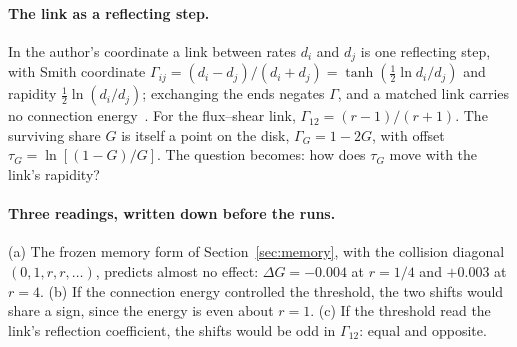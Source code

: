 \documentclass[11pt]{article}
\begin{document}
\paragraph{The link as a reflecting step.} In the author's coordinate a link between rates $d_i$ and $d_j$ is one reflecting step, with Smith coordinate $\Gamma_{ij}=(d_i-d_j)/(d_i+d_j)=\tanh(\tfrac12\ln d_i/d_j)$ and rapidity $\tfrac12\ln(d_i/d_j)$; exchanging the ends negates $\Gamma$, and a matched link carries no connection energy~\cite{CE}. For the flux--shear link, $\Gamma_{12}=(r-1)/(r+1)$. The surviving share $G$ is itself a point on the disk, $\Gamma_G=1-2G$, with offset $\tau_G=\ln[(1-G)/G]$. The question becomes: how does $\tau_G$ move with the link's rapidity?

\paragraph{Three readings, written down before the runs.} (a) The frozen memory form of Section~\ref{sec:memory}, with the collision diagonal $(0,1,r,r,\dots)$, predicts almost no effect: $\Delta G=-0.004$ at $r=1/4$ and $+0.003$ at $r=4$. (b) If the connection energy controlled the threshold, the two shifts would share a sign, since the energy is even about $r=1$. (c) If the threshold read the link's reflection coefficient, the shifts would be odd in $\Gamma_{12}$: equal and opposite.
\end{document}
